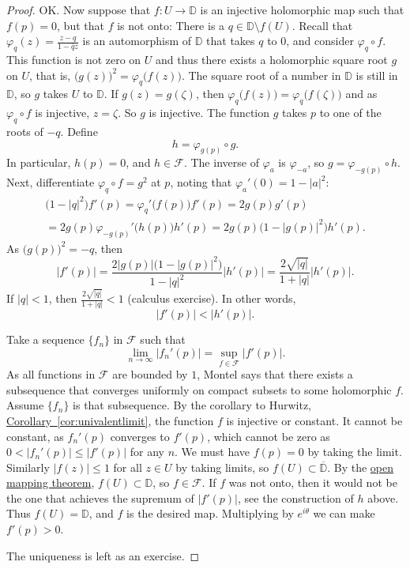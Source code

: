 \documentclass[12pt,openany]{book}
\newcommand{\sabs}[1]{\lvert {#1} \rvert}
\newcommand{\D}{{\mathbb{D}}}
\newcommand{\sF}{{\mathscr{F}}}
\theoremstyle{plain}
\theoremstyle{remark}
\theoremstyle{definition}
\theoremstyle{exercise}
\theoremstyle{example}
\newcommand{\corref}[1]{\hyperref[#1]{Corollary~\ref*{#1}}}
\begin{document}
\begin{proof}
OK\@.  Now suppose that $f \colon U \to \D$ is an injective holomorphic map
such that $f(p) = 0$, but that $f$ is not onto: There is a
$q \in \D \setminus f(U)$.
Recall that
$\varphi_q(z) = \frac{z-q}{1-\bar{q}z}$ is an automorphism of $\D$ that
takes $q$ to $0$, and consider $\varphi_q \circ f$.  This function is not
zero on $U$ and thus
there exists a holomorphic square root $g$ on $U$, that is,
${\bigl(g(z)\bigr)}^2 = \varphi_q\bigl(f(z)\bigr)$.
The square root of a number in $\D$ is still in $\D$, so $g$
takes $U$ to $\D$.
If $g(z)=g(\zeta)$, then $\varphi_q\bigl(f(z)\bigr)=\varphi_q\bigl(f(\zeta)\bigr)$ and as
$\varphi_q \circ f$ is injective, $z=\zeta$.  So $g$ is injective.  
The function $g$ takes $p$ to one of the roots of $-q$.
Define
\begin{equation*}
h = \varphi_{g(p)} \circ g .
\end{equation*}
In particular, $h(p) = 0$, and $h \in \sF$.
The inverse of $\varphi_a$ is $\varphi_{-a}$, so
$g = \varphi_{-g(p)} \circ h$.
Next, differentiate
$\varphi_q \circ f = g^2$ at $p$, noting that
$\varphi_a'(0) = 1-\sabs{a}^2$:
\begin{multline*}
\bigl(1-\sabs{q}^2\bigr) f'(p)
= \varphi_q'\bigl(f(p)\bigr) f'(p)
= 2 g(p) g'(p)
\\
= 2 g(p) \varphi_{-g(p)}'\bigl(h(p)\bigr) h'(p)
= 2 g(p) \bigl(1-\sabs{g(p)}^2\bigr) h'(p) .
\end{multline*}
As ${\bigl(g(p)\bigr)}^2 = -q$, then
\begin{equation*}
\sabs{f'(p)} =
\frac{2 \sabs{g(p)} \bigl(1-\sabs{g(p)}^2\bigr)}{1-\sabs{q}^2} \sabs{h'(p)}
=
\frac{2 \sqrt{\sabs{q}}}{1+\sabs{q}} \sabs{h'(p)} .
\end{equation*}
If $\sabs{q} < 1$, then $\frac{2 \sqrt{\sabs{q}}}{1+\sabs{q}} < 1$
(calculus exercise).
In other words,
\begin{equation*}
\sabs{f'(p)} < \sabs{h'(p)} .
\end{equation*}

Take a sequence $\{ f_n \}$ in
$\sF$ such that
\begin{equation*}
\lim_{n \to \infty} \sabs{f_n'(p)} = \sup_{f \in \sF} \sabs{f'(p)} .
\end{equation*}
As all functions in $\sF$ are bounded by $1$,
Montel says that there exists a subsequence that converges uniformly on
compact subsets to some holomorphic $f$.  Assume $\{ f_n \}$ is that subsequence.
By the corollary to Hurwitz,
\corref{cor:univalentlimit},
the function $f$ is injective or constant.  It cannot be constant,
as $f_n'(p)$ converges to $f'(p)$, which
cannot be zero as  
$0 < \sabs{f_n'(p)} \leq \sabs{f'(p)}$ for any $n$.
We must have $f(p) = 0$ by taking the limit.
Similarly 
$\sabs{f(z)} \leq 1$ for all $z \in U$ by taking limits,
so $f(U) \subset \overline{\D}$.
By the \hyperref[thm:OMT]{open mapping theorem}, $f(U) \subset \D$, so $f \in
\sF$.  If $f$ was not onto, then it would not be the one that achieves the
supremum of $\sabs{f'(p)}$, see the construction of $h$ above.
Thus $f(U) = \D$, and $f$ is the desired map.
Multiplying by $e^{i\theta}$ we can make $f'(p) > 0$.

The uniqueness is left as an exercise.
\end{proof}
\end{document}
